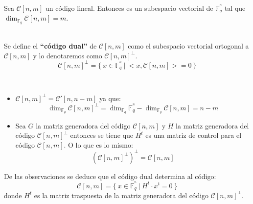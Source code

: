 Sea $\mathcal{C}[n,m]$ un c\'odigo lineal. Entonces es un subespacio vectorial
de $\mathbb{F}^{^n}_q$ tal que $\dim_{\mathbb{F}_q} \mathcal{C}[n,m]=m$.
\begin{definicion}
\ \\
Se define el \textbf{``c\'odigo dual''} de $\mathcal{C}[n,m]$ como el subespacio
vectorial ortogonal a $\mathcal{C}[n,m]$ y lo denotaremos como
$\mathcal{C}[n,m]^{\perp}$.
\begin{displaymath}
\mathcal{C}[n,m]^{\perp} = \{\ x\in \mathbb{F}^{^n}_q\ |\
<x,\mathcal{C}[n,m]> = 0\ \}
\end{displaymath}
\end{definicion}
\begin{observacion}
\ \\
\begin{itemize}
\item $\mathcal{C}[n,m]^{\perp}=\mathcal{C}'[n,n-m]$ ya que:
\begin{displaymath}
\dim_{\mathbb{F}_q} \mathcal{C}[n,m]^{\perp} =\dim_{\mathbb{F}_q}
\mathbb{F}^{^n}_q - \dim_{\mathbb{F}_q} \mathcal{C}[n,m] = n-m
\end{displaymath}
\item Sea $G$ la matriz generadora del c\'odigo $\mathcal{C}[n,m]$ y $H$ la
matriz generadora del c\'odigo $\mathcal{C}[n,m]^{\perp}$ entonces se tiene que
$H^t$ es una matriz de control para el c\'odigo $\mathcal{C}[n,m]$. O lo que es
lo mismo:
\begin{displaymath}
\left( \mathcal{C}[n,m]^{\perp} \right)^{\perp} = \mathcal{C}[n,m]
\end{displaymath}
\end{itemize}
\end{observacion}
De las observaciones se deduce que el c\'odigo dual determina al c\'odigo:
\begin{displaymath}
\mathcal{C}[n,m] = \{\ x\in \mathbb{F}^{^n}_q\ |\ H^t \cdot x^t=0\ \}
\end{displaymath}
donde $H^t$ es la matriz traspuesta de la matriz generadora del c\'odigo
$\mathcal{C}[n,m]^{\perp}$.
